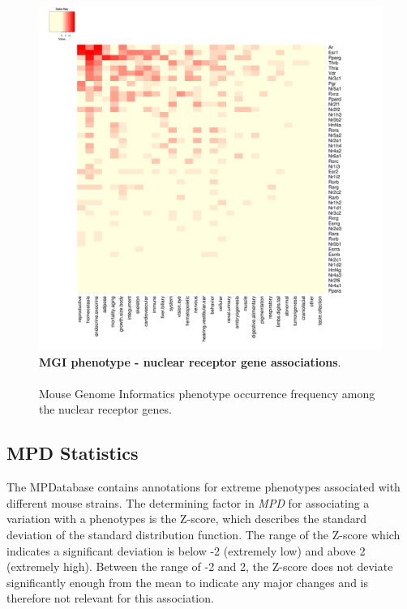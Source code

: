 \documentclass[fleqn,11pt]{SelfArx}
\begin{document}
\begin{figure}[H]
	\centering
	\includegraphics[width=\linewidth, height=0.99\linewidth]{pics/mgi_phenotypes_nr.pdf}
	\captionsetup{margin=12pt,format=plain,font=footnotesize,labelfont=bf}
 	\caption{\footnotesize{\textbf{MGI phenotype - nuclear receptor gene associations}. 
	~~~~~~~\\
	Mouse Genome Informatics phenotype occurrence frequency among the nuclear receptor genes.}}
	\label{fig:mgi_pheotypes_nr}
\end{figure}

\subsection{MPD Statistics}
The MPDatabase contains annotations for extreme phenotypes associated with different mouse strains. The determining factor in \textit{MPD} for associating a variation with a phenotypes is the Z-score, which describes the standard deviation of the standard distribution function. The range of the Z-score which indicates a significant deviation is below -2 (extremely low) and above 2 (extremely high). Between the range of -2 and 2, the Z-score does not deviate significantly enough from the mean to indicate any major changes and is therefore not relevant for this association.
\end{document}

